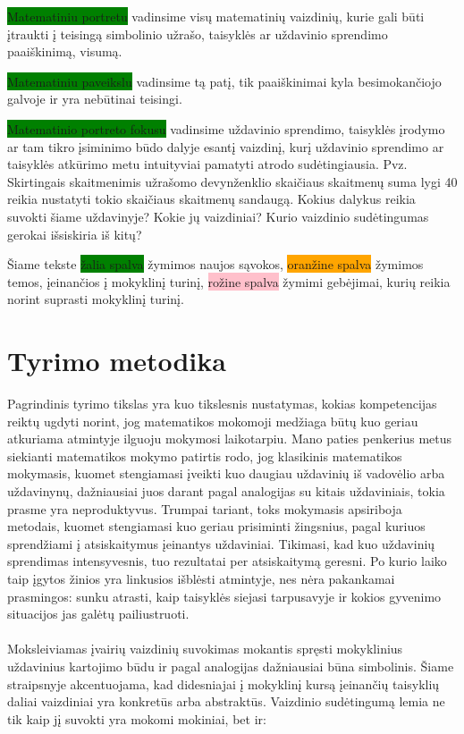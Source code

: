 \documentclass[a4paper]{article}
\begin{document}
\colorbox{green}{Matematiniu portretu} vadinsime visų matematinių vaizdinių, kurie gali būti įtraukti į teisingą simbolinio užrašo, taisyklės ar uždavinio sprendimo paaiškinimą, visumą.

\colorbox{green}{Matematiniu paveikslu} vadinsime tą patį, tik paaiškinimai kyla besimokančiojo galvoje ir yra nebūtinai teisingi.

\colorbox{green}{Matematinio portreto fokusu} vadinsime uždavinio sprendimo, taisyklės įrodymo ar tam tikro įsiminimo būdo dalyje esantį vaizdinį, kurį uždavinio sprendimo ar taisyklės atkūrimo metu intuityviai pamatyti atrodo sudėtingiausia. Pvz. Skirtingais skaitmenimis užrašomo devynženklio skaičiaus skaitmenų suma lygi 40 reikia nustatyti tokio skaičiaus skaitmenų sandaugą. Kokius dalykus reikia suvokti šiame uždavinyje? Kokie jų vaizdiniai? Kurio vaizdinio sudėtingumas gerokai išsiskiria iš kitų?

Šiame tekste \colorbox{green}{žalia spalva} žymimos naujos sąvokos, \colorbox{orange}{oranžine spalva} žymimos temos, įeinančios į mokyklinį turinį, \colorbox{pink}{rožine spalva} žymimi gebėjimai, kurių reikia norint suprasti mokyklinį turinį.

\section{Tyrimo metodika}

Pagrindinis tyrimo tikslas yra kuo tikslesnis nustatymas, kokias kompetencijas reiktų ugdyti norint, jog matematikos mokomoji medžiaga būtų kuo geriau atkuriama atmintyje ilguoju mokymosi laikotarpiu. Mano paties penkerius metus siekianti matematikos mokymo patirtis rodo, jog klasikinis matematikos mokymasis, kuomet stengiamasi įveikti kuo daugiau uždavinių iš vadovėlio arba uždavinynų, dažniausiai juos darant pagal analogijas su kitais uždaviniais, tokia prasme yra neproduktyvus. Trumpai tariant, toks mokymasis apsiriboja metodais, kuomet stengiamasi kuo geriau prisiminti žingsnius, pagal kuriuos sprendžiami į atsiskaitymus įeinantys uždaviniai. Tikimasi, kad kuo uždavinių sprendimas intensyvesnis, tuo rezultatai per atsiskaitymą geresni. Po kurio laiko taip įgytos žinios yra linkusios išblėsti atmintyje, nes nėra pakankamai prasmingos: sunku atrasti, kaip taisyklės siejasi tarpusavyje ir kokios gyvenimo situacijos jas galėtų pailiustruoti. \\ \\

Moksleiviamas įvairių vaizdinių suvokimas mokantis spręsti mokyklinius uždavinius kartojimo būdu ir pagal analogijas dažniausiai būna simbolinis. Šiame straipsnyje akcentuojama, kad didesniajai į mokyklinį kursą įeinančių taisyklių daliai vaizdiniai yra konkretūs arba abstraktūs. Vaizdinio sudėtingumą lemia ne tik kaip jį suvokti yra mokomi mokiniai, bet ir:
\end{document}
